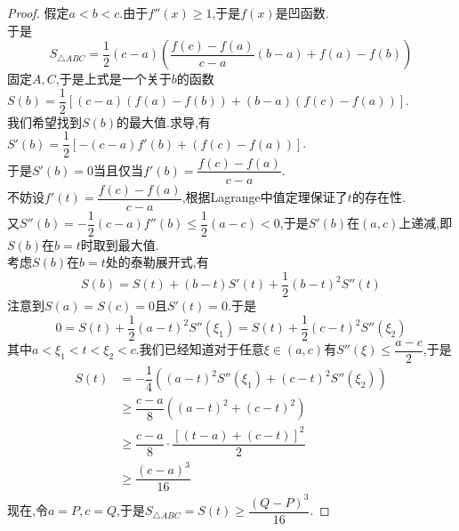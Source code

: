 \documentclass{ctexart}
\begin{document}
\begin{proof}
    假定$a<b<c$.由于$f''(x)\geqslant1$,于是$f(x)$是凹函数.\\
    于是\[S_{\triangle ABC}=\dfrac{1}{2}(c-a)\left(\dfrac{f(c)-f(a)}{c-a}(b-a)+f(a)-f(b)\right)\]
    固定$A,C$,于是上式是一个关于$b$的函数
    $S(b)=\dfrac{1}{2}\left[(c-a)(f(a)-f(b))+(b-a)(f(c)-f(a))\right]$.\\
    我们希望找到$S(b)$的最大值.求导,有
    $S'(b)=\dfrac{1}{2}\left[-(c-a)f'(b)+(f(c)-f(a))\right]$.\\
    于是$S'(b)=0$当且仅当$f'(b)=\dfrac{f(c)-f(a)}{c-a}$.\\
    不妨设$f'(t)=\dfrac{f(c)-f(a)}{c-a}$,根据Lagrange中值定理保证了$t$的存在性.\\
    又$S''(b)=-\dfrac12(c-a)f''(b)\leqslant\dfrac12(a-c)<0$,于是$S'(b)$在$(a,c)$上递减,即$S(b)$在$b=t$时取到最大值.\\
    考虑$S(b)$在$b=t$处的泰勒展开式,有
    \[S(b)=S(t)+(b-t)S'(t)+\dfrac{1}{2}(b-t)^2S''(t)\]
    注意到$S(a)=S(c)=0$且$S'(t)=0$.于是
    \[0=S(t)+\dfrac{1}{2}(a-t)^2S''(\xi_1)=S(t)+\dfrac{1}{2}(c-t)^2S''(\xi_2)\]
    其中$a<\xi_1<t<\xi_2<c$.我们已经知道对于任意$\xi\in(a,c)$有$S''(\xi)\leqslant\dfrac{a-c}{2}$,于是
    \[\begin{aligned}
        S(t)
        &= -\dfrac{1}{4}\left((a-t)^2S''(\xi_1)+(c-t)^2S''(\xi_2)\right) \\
        &\geqslant \dfrac{c-a}8\left((a-t)^2+(c-t)^2\right) \\
        &\geqslant \dfrac{c-a}{8}\cdot\dfrac{[(t-a)+(c-t)]^2}{2} \\
        &\geqslant \dfrac{(c-a)^3}{16}
    \end{aligned}\]
    现在,令$a=P,c=Q$,于是$S_{\triangle ABC}=S(t)\geqslant\dfrac{(Q-P)^3}{16}$.
\end{proof}
\end{document}
